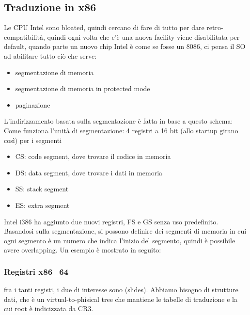 \documentclass[12pt, oneside]{extbook} %
\begin{document}
\subsection{Traduzione in x86}
Le CPU Intel sono bloated, quindi cercano di fare di tutto per dare retro-compatibilità, quindi ogni volta che c'è una nuova facility viene disabilitata per default, quando parte un nuovo chip Intel è come se fosse un 8086, ci pensa il SO ad abilitare tutto ciò che serve:
\begin{itemize}
\item segmentazione di memoria
\item segmentazione di memoria in protected mode
\item paginazione
\end{itemize}
L'indirizzamento basata sulla segmentazione è fatta in base a questo schema:
Come funziona l'unità di segmentazione: 4 registri a 16 bit (allo startup girano così) per i segmenti
\begin{itemize}
\item CS: code segment, dove trovare il codice in memoria
\item DS: data segment, dove trovare i dati in memoria
\item SS: stack segment
\item ES: extra segment
\end{itemize}
Intel i386 ha aggiunto due nuovi registri, FS e GS senza uso predefinito.\\ Basandosi sulla segmentazione, si possono definire dei segmenti di memoria in cui ogni segmento è un numero che indica l'inizio del segmento, quindi è possibile avere overlapping. Un esempio è mostrato in seguito:
\subsubsection{Registri x86\_64}
fra i tanti registi, i due di interesse sono (slides). Abbiamo bisogno di strutture dati, che è un virtual-to-phisical tree che mantiene le tabelle di traduzione e la cui root è indicizzata da CR3.
\end{document}
